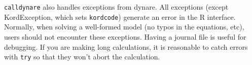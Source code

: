 \documentclass[12pt,a4paper]{article}
\begin{document}
\lstinline{calldynare} also handles exceptions from dynare.  All
exceptions (except KordException, which sets \lstinline{kordcode})
generate an error in the R interface.  Normally, when solving a
well-formed model (no typos in the equations, etc), users should not
encounter these exceptions.  Having a journal file is useful for
debugging.  If you are making long calculations, it is reasonable to
catch errors with \lstinline{try} so that they won't abort the
calculation.

% 
% 
\end{document}
